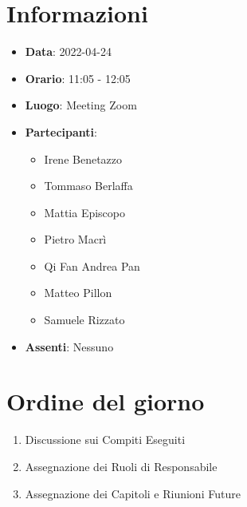 \section{Informazioni}
	\begin{itemize}
		\item \textbf{Data}: 2022-04-24     %
		\item \textbf{Orario}: 11:05 - 12:05             %
		\item \textbf{Luogo}: Meeting Zoom
		\item \textbf{Partecipanti}:
		\begin{itemize}
			\item Irene Benetazzo
			\item Tommaso Berlaffa
			\item Mattia Episcopo
			\item Pietro Macrì
			\item Qi Fan Andrea Pan
			\item Matteo Pillon
			\item Samuele Rizzato
		\end{itemize}
        \item \textbf{Assenti}: Nessuno
	\end{itemize}
    
	\section{Ordine del giorno}
	\begin{enumerate}
		\item Discussione sui Compiti Eseguiti
		\item Assegnazione dei Ruoli di Responsabile
		\item Assegnazione dei Capitoli e Riunioni Future
	\end{enumerate}
	\newpage
